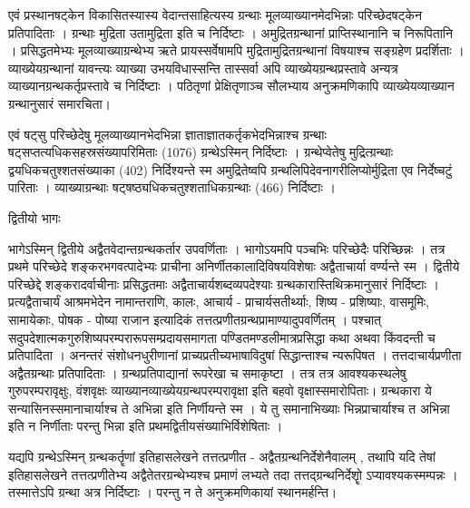एवं प्रस्थानषट्केन विकासितस्यास्य वेदान्तसाहित्यस्य ग्रन्थाः मूलव्याख्यानमेदभिन्नाः परिच्छेदषट्केन प्रतिपादिताः । ग्रन्थाः मुद्रिता उतामुद्रिता इति च निर्दिष्टाः । अमुद्रितग्रन्थानां प्राप्तिस्थानानि च निरूपितानि । प्रसिद्धतमेभ्यः मूलव्याख्याग्रन्थेभ्य ऋते प्रायस्सर्वेषामपि मुद्रितामुद्रितग्रन्थानां विषयाश्च सङ्ग्रहेण प्रदर्शिताः । व्याख्येयग्रन्थानां यावन्त्यः व्याख्या उभयविधास्सन्ति तास्सर्वा अपि व्याख्येयग्रन्थप्रस्तावे अन्यत्र व्याख्यानग्रन्थकर्तृप्रस्तावे च निर्दिष्टाः । पठितृणां प्रेक्षितृणाञ्च सौलभ्याय अनुक्रमणिकापि व्याख्येयव्याख्यान ग्रन्थानुसारं समारचिता। 

एवं षट्सु परिच्छेदेषु मूलव्याख्यानभेदभिन्ना ज्ञाताज्ञातकर्तृकभेदभिन्नाश्च ग्रन्थाः षट्सप्तत्यधिकसहस्रसंख्यापरिमिताः (1076) ग्रन्थेऽस्मिन् निर्दिष्टाः । ग्रन्थेप्वेतेषु मुद्रित्ग्रन्थाः द्वयधिकचतुश्शतसंख्याका (402) निर्दिश्यन्ते स्म अमुद्रितेष्वपि ग्रन्थलिपिदेवनागरीलिप्योर्मुद्रिता एव निर्देष्चटुं पारिताः । व्याख्याग्रन्थाः षट्षष्ठ्यधिकचतुश्शताधिकग्रन्थाः (466) निर्दिष्टाः । 

द्वितीयो भागः 

भागेऽस्मिन् द्वितीये अद्वैतवेदान्तग्रन्थकर्तार उपवर्णिताः । भागोऽयमपि पञ्चभिः परिच्छेदैः परिच्छिन्नः । तत्र प्रथमे परिच्छेदे शङ्करभगवत्पादेभ्यः प्राचीना अनिर्णीतकालादिविषयविशेषाः अद्वैताचार्या वर्ण्यन्ते स्म । द्वितीये परिच्छेद्दे शङ्करादर्वाचीनाः प्रसिद्धतमाः अद्वैताचार्यशब्दव्यपदेश्याः ग्रन्थकारास्तिथिक्रमानुसारं निर्दिष्टाः । प्रत्यद्वैताचार्यं आश्रमभेदेन नामान्तराणि, कालः, आचार्य - प्राचार्यसतीर्थ्याः, शिष्य - प्रशिष्याः, वासमूमिः, सामायेकाः, पोषक - पोष्या राजान इत्यादिकं तत्तत्प्रणीतग्रन्थप्रामाण्यादुपवर्णितम् । पश्चात् सदुपदेशात्मकगुरुशिष्यपरम्परारूपसम्प्रदायसमागता पण्डितमण्डलीमात्रप्रसिद्धा कथा अथवा किंवदन्ती च प्रतिपादिता । अनन्तरं संशोधनधुरीणानां प्राच्यप्रतीच्यभाषाविदुषां सिद्धान्ताश्च न्यरूपिषत । तत्तदाचार्यप्रणीता अद्वैतग्रन्थाः प्रतिपादिताः । ग्रन्थप्रतिपाद्यानां रूपरेखा च समाकृष्टा । तत्र तत्र आवश्यकस्थलेषु गुरुपरम्परावृक्षुः, वंशवृक्षः व्याख्यानव्याख्येयग्रन्थपरम्परावृक्षा इति बहवो वृक्षास्समारोपिताः। ग्रन्थकारा ये सन्यासिनस्समानाचार्याश्च ते अभिन्ना इति निर्णीयन्ते स्म । ये तु समानाभिख्याः भिन्नप्राचार्याश्च त अभिन्ना इति न निर्णीताः परन्तु भिन्ना इति प्रथमद्वितीयसंख्याभिर्विशेषिताः । 

यद्यपि ग्रन्थेऽस्मिन् ग्रन्थकर्तॄणां इतिहासलेखने तत्तत्प्रणीत - अद्वैतग्रन्थनिर्देशेनैवालम् , तथापि यदि तेषां इतिहासलेखने तत्तत्प्रणीतेभ्य अद्वैतेतरग्रन्थेभ्यश्च प्रमाणं लभ्यते तदा तत्तद्ग्रन्थनिर्देशोॄ ऽप्यावश्यकस्मम्पन्नः । तस्मात्तेऽपि ग्रन्था अत्र निर्दिष्टाः । परन्तु न ते अनुक्रमणिकायां स्थानमर्हन्ति। 

